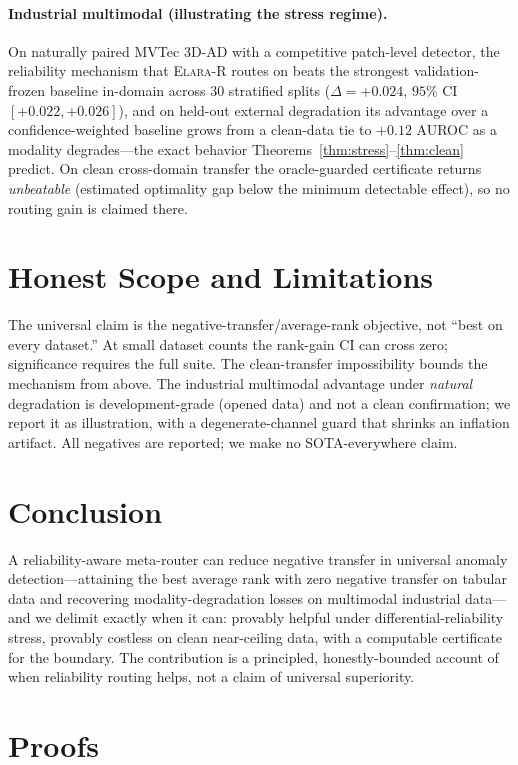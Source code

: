 \documentclass[11pt]{article}
\newcommand{\router}{\textsc{Elara-R}}
\begin{document}
\paragraph{Industrial multimodal (illustrating the stress regime).} On naturally
paired MVTec 3D-AD with a competitive patch-level detector, the reliability mechanism
that \router{} routes on beats the strongest validation-frozen baseline in-domain
across $30$ stratified splits ($\Delta=+0.024$, $95\%$ CI $[+0.022,+0.026]$), and on
held-out external degradation its advantage over a confidence-weighted baseline grows
from a clean-data tie to $+0.12$ AUROC as a modality degrades---the exact behavior
Theorems~\ref{thm:stress}--\ref{thm:clean} predict. On clean cross-domain transfer the
oracle-guarded certificate returns \emph{unbeatable} (estimated optimality gap below
the minimum detectable effect), so no routing gain is claimed there.

\section{Honest Scope and Limitations}
The universal claim is the negative-transfer/average-rank objective, not
``best on every dataset.'' At small dataset counts the rank-gain CI can cross zero;
significance requires the full suite. The clean-transfer impossibility bounds the
mechanism from above. The industrial multimodal advantage under \emph{natural}
degradation is development-grade (opened data) and not a clean confirmation; we
report it as illustration, with a degenerate-channel guard that shrinks an inflation
artifact. All negatives are reported; we make no SOTA-everywhere claim.

\section{Conclusion}
A reliability-aware meta-router can reduce negative transfer in universal anomaly
detection---attaining the best average rank with zero negative transfer on tabular
data and recovering modality-degradation losses on multimodal industrial data---and
we delimit exactly when it can: provably helpful under differential-reliability
stress, provably costless on clean near-ceiling data, with a computable certificate
for the boundary. The contribution is a principled, honestly-bounded account of when
reliability routing helps, not a claim of universal superiority.

\appendix
\section{Proofs}
\end{document}
